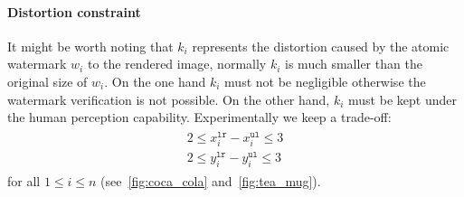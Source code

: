 \paragraph[Distortion constraint]{Distortion constraint}
It might be worth noting that $k_i$ represents the distortion caused by the atomic watermark $w_i$ to the rendered image, normally $k_i$ is much smaller than the original size of $w_i$. On the one hand $k_i$ must not be negligible otherwise the watermark verification is not possible. On the other hand, $k_i$ must be kept under the human perception capability. Experimentally we keep a trade-off:
\begin{align}\label{eq:side_constraint}
\begin{split}
    2 \leq x^{\mathtt{lr}}_{i} - x^{\mathtt{ul}}_{i} \leq 3 \\
    2 \leq y^{\mathtt{lr}}_{i} - y^{\mathtt{ul}}_{i} \leq 3
\end{split}
\end{align}
for all $1 \leq i \leq n$ (see~\autoref{fig:coca_cola} and~\autoref{fig:tea_mug}).

